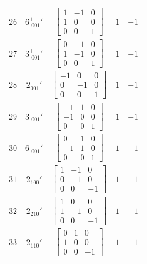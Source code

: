 \documentclass[fleqn,8pt]{jsarticle}
\begin{document}
\begin{longtable}{ccccc}
$ 26 $ & $ 6^{+}_{\,\,001}{}' $ & $ \begin{bmatrix} 1 & -1 & 0 \\ 1 & 0 & 0 \\ 0 & 0 & 1 \end{bmatrix} $ & $ 1 $ & $ -1 $ \\ \hline
$ 27 $ & $ 3^{+}_{\,\,001}{}' $ & $ \begin{bmatrix} 0 & -1 & 0 \\ 1 & -1 & 0 \\ 0 & 0 & 1 \end{bmatrix} $ & $ 1 $ & $ -1 $ \\ \hline
$ 28 $ & $ 2{}_{001}{}' $ & $ \begin{bmatrix} -1 & 0 & 0 \\ 0 & -1 & 0 \\ 0 & 0 & 1 \end{bmatrix} $ & $ 1 $ & $ -1 $ \\ \hline
$ 29 $ & $ 3^{-}_{\,\,001}{}' $ & $ \begin{bmatrix} -1 & 1 & 0 \\ -1 & 0 & 0 \\ 0 & 0 & 1 \end{bmatrix} $ & $ 1 $ & $ -1 $ \\ \hline
$ 30 $ & $ 6^{-}_{\,\,001}{}' $ & $ \begin{bmatrix} 0 & 1 & 0 \\ -1 & 1 & 0 \\ 0 & 0 & 1 \end{bmatrix} $ & $ 1 $ & $ -1 $ \\ \hline
$ 31 $ & $ 2{}_{100}{}' $ & $ \begin{bmatrix} 1 & -1 & 0 \\ 0 & -1 & 0 \\ 0 & 0 & -1 \end{bmatrix} $ & $ 1 $ & $ -1 $ \\ \hline
$ 32 $ & $ 2{}_{210}{}' $ & $ \begin{bmatrix} 1 & 0 & 0 \\ 1 & -1 & 0 \\ 0 & 0 & -1 \end{bmatrix} $ & $ 1 $ & $ -1 $ \\ \hline
$ 33 $ & $ 2{}_{110}{}' $ & $ \begin{bmatrix} 0 & 1 & 0 \\ 1 & 0 & 0 \\ 0 & 0 & -1 \end{bmatrix} $ & $ 1 $ & $ -1 $ \\ \hline

\end{longtable}
\end{document}
